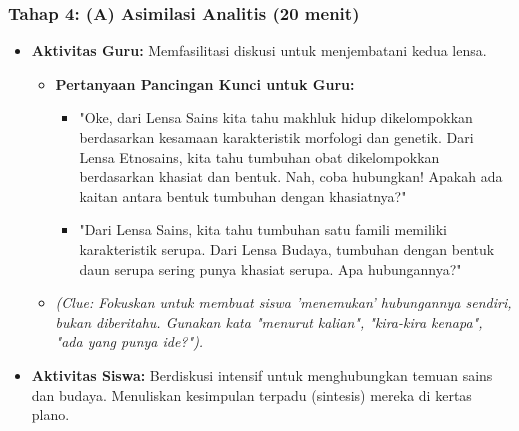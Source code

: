 \documentclass[a4paper,12pt]{article}
\begin{document}
\subsubsection{Tahap 4: (A) Asimilasi Analitis (20 menit)}
\begin{itemize}
\item \textbf{Aktivitas Guru:} Memfasilitasi diskusi untuk menjembatani kedua lensa.
    \begin{itemize}
    \item \textbf{Pertanyaan Pancingan Kunci untuk Guru:}
        \begin{itemize}
        \item "Oke, dari Lensa Sains kita tahu makhluk hidup dikelompokkan berdasarkan kesamaan karakteristik morfologi dan genetik. Dari Lensa Etnosains, kita tahu tumbuhan obat dikelompokkan berdasarkan khasiat dan bentuk. Nah, coba hubungkan! Apakah ada kaitan antara bentuk tumbuhan dengan khasiatnya?"
        \item "Dari Lensa Sains, kita tahu tumbuhan satu famili memiliki karakteristik serupa. Dari Lensa Budaya, tumbuhan dengan bentuk daun serupa sering punya khasiat serupa. Apa hubungannya?"
        \end{itemize}
    \item \textit{(Clue: Fokuskan untuk membuat siswa 'menemukan' hubungannya sendiri, bukan diberitahu. Gunakan kata "menurut kalian", "kira-kira kenapa", "ada yang punya ide?").}
    \end{itemize}
\item \textbf{Aktivitas Siswa:} Berdiskusi intensif untuk menghubungkan temuan sains dan budaya. Menuliskan kesimpulan terpadu (sintesis) mereka di kertas plano.
\end{itemize}
\end{document}
